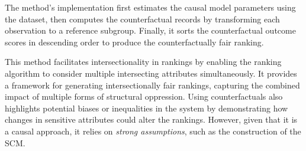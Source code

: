 
The method's implementation first estimates the causal model parameters using the dataset, then computes the counterfactual records by transforming each observation to a reference subgroup. Finally, it sorts the counterfactual outcome scores in descending order to produce the counterfactually fair ranking.


This method facilitates intersectionality in rankings by enabling the ranking algorithm to consider multiple intersecting attributes simultaneously. It provides a framework for generating intersectionally fair rankings, capturing the combined impact of multiple forms of structural oppression. Using counterfactuals also highlights potential biases or inequalities in the system by demonstrating how changes in sensitive attributes could alter the rankings.
However, given that it is a causal approach, it relies on \emph{strong assumptions}, such as the construction of the SCM.

